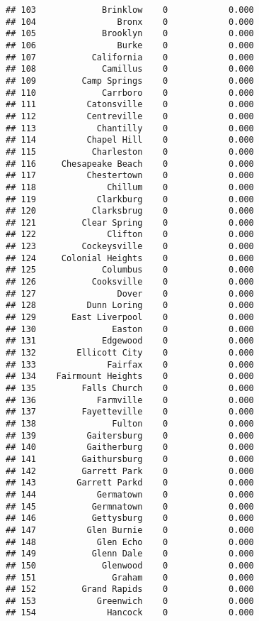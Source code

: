 \documentclass[]{article}
\begin{document}
\begin{verbatim}
## 103             Brinklow    0            0.000
## 104                Bronx    0            0.000
## 105             Brooklyn    0            0.000
## 106                Burke    0            0.000
## 107           California    0            0.000
## 108             Camillus    0            0.000
## 109         Camp Springs    0            0.000
## 110             Carrboro    0            0.000
## 111          Catonsville    0            0.000
## 112          Centreville    0            0.000
## 113            Chantilly    0            0.000
## 114          Chapel Hill    0            0.000
## 115           Charleston    0            0.000
## 116     Chesapeake Beach    0            0.000
## 117          Chestertown    0            0.000
## 118              Chillum    0            0.000
## 119            Clarkburg    0            0.000
## 120           Clarksbrug    0            0.000
## 121         Clear Spring    0            0.000
## 122              Clifton    0            0.000
## 123         Cockeysville    0            0.000
## 124     Colonial Heights    0            0.000
## 125             Columbus    0            0.000
## 126           Cooksville    0            0.000
## 127                Dover    0            0.000
## 128          Dunn Loring    0            0.000
## 129       East Liverpool    0            0.000
## 130               Easton    0            0.000
## 131             Edgewood    0            0.000
## 132        Ellicott City    0            0.000
## 133              Fairfax    0            0.000
## 134    Fairmount Heights    0            0.000
## 135         Falls Church    0            0.000
## 136            Farmville    0            0.000
## 137         Fayetteville    0            0.000
## 138               Fulton    0            0.000
## 139          Gaitersburg    0            0.000
## 140          Gaitherburg    0            0.000
## 141         Gaithursburg    0            0.000
## 142         Garrett Park    0            0.000
## 143        Garrett Parkd    0            0.000
## 144            Germatown    0            0.000
## 145           Germnatown    0            0.000
## 146           Gettysburg    0            0.000
## 147          Glen Burnie    0            0.000
## 148            Glen Echo    0            0.000
## 149           Glenn Dale    0            0.000
## 150             Glenwood    0            0.000
## 151               Graham    0            0.000
## 152         Grand Rapids    0            0.000
## 153            Greenwich    0            0.000
## 154              Hancock    0            0.000

\end{verbatim}
\end{document}
